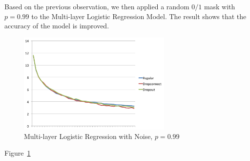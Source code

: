 Based on the previous observation, we then applied a random $0/1$ mask
with $p=0.99$ to the Multi-layer Logistic Regression Model. The result
shows that the accuracy of the model is improved.

\begin{figure}[h]
\centering
\includegraphics[width=215pt]{figs/mlp_pbig.png}
\caption{Multi-layer Logistic Regression with Noise, $p=0.99$}
\label{fig:mlp-noise-pbig}
\end{figure}

Figure~\ref{fig:mlp-noise-pbig}

